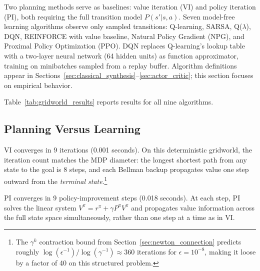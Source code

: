 Two planning methods serve as baselines: value iteration (VI) and policy iteration (PI), both requiring the full transition model $P(s'|s,a)$. Seven model-free learning algorithms observe only sampled transitions: Q-learning, SARSA, Q($\lambda$), DQN, REINFORCE with value baseline, Natural Policy Gradient (NPG), and Proximal Policy Optimization (PPO). DQN replaces Q-learning's lookup table with a two-layer neural network (64 hidden units) as function approximator, training on minibatches sampled from a replay buffer. Algorithm definitions appear in Sections~\ref{sec:classical_synthesis}--\ref{sec:actor_critic}; this section focuses on empirical behavior.

Table~\ref{tab:gridworld_results} reports results for all nine algorithms.

\begin{table}[ht]
\centering
\caption{Performance of nine algorithms on the $5 \times 5$ gridworld. ``Ep to $V^*$ conv'' is the first checkpoint at which $\max_s |V(s) - V^*(s)| < 0.1$ across all 25 states; ``---'' indicates the algorithm never reaches this threshold. All seven learning algorithms achieve the optimal return of 9.30, but only Q-learning, Q($\lambda$), and DQN converge to $V^*$ everywhere.}
\label{tab:gridworld_results}
\footnotesize
\setlength{\tabcolsep}{4pt}

\end{table}

\subsection{Planning Versus Learning}
\label{sec:illustrated_planning}

VI converges in 9 iterations (0.001 seconds). On this deterministic gridworld, the iteration count matches the MDP diameter: the longest shortest path from any state to the goal is 8 steps, and each Bellman backup propagates value one step outward from the \textit{terminal state}.\footnote{The $\gamma^k$ contraction bound from Section~\ref{sec:newton_connection} predicts roughly $\log(\epsilon^{-1}) / \log(\gamma^{-1}) \approx 360$ iterations for $\epsilon = 10^{-8}$, making it loose by a factor of 40 on this structured problem.}

PI converges in 9 policy-improvement steps (0.018 seconds). At each step, PI solves the linear system $V^\pi = r^\pi + \gamma P^\pi V^\pi$ and propagates value information across the full state space simultaneously, rather than one step at a time as in VI.

